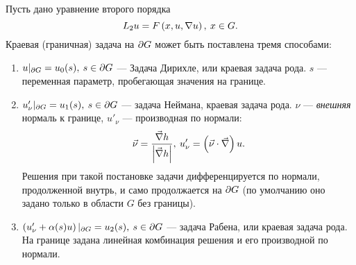     Пусть дано уравнение второго порядка
    \begin{equation*}
        L_2 u = F\left({x, u, \nabla u}\right),\: x \in G.
    \end{equation*}
    Краевая (граничная) задача на $\partial G$ может быть поставлена тремя способами:
    \begin{enumerate}
        \item $u|_{\partial G} = u_0(s),\: s \in \partial G$  --- Задача Дирихле, или краевая задача  рода. $s$ --- 
        переменная параметр, пробегающая значения на границе.
        \item $u'_{\nu} |_{\partial G} = u_1(s),\: s \in \partial G$ --- задача Неймана, краевая задача  рода. $\nu$ --- \textit{внешняя}
        нормаль к границе, $u'_{\nu}$ --- производная по нормали:
        \begin{equation*}
            \vec{\nu} = \frac{\vec{\nabla} h}{\left|{\vec{\nabla} h}\right|},\: u'_{\nu} = \left({\vec{\nu}\cdot\vec{\nabla}}\right)u.
        \end{equation*}
        Решения при такой постановке задачи дифференцируется по нормали, продолженной внутрь, и само продолжается на $\partial G$ (по умолчанию оно задано только 
        в области $G$ без границы).
        \item $\left({u'_{\nu} + \alpha(s)u}\right)|_{\partial G} = u_2(s),\: s \in \partial G $ --- задача Рабена, или краевая задача  рода. На границе
        задана линейная комбинация решения и его производной по нормали.
    \end{enumerate}

